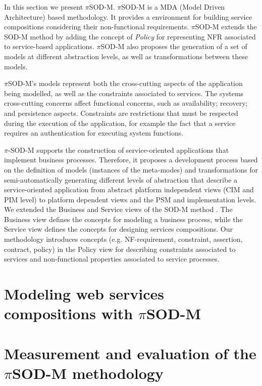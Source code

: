 \documentclass[runningheads,a4paper]{llncs}
\begin{document}
In this section we present $\pi$SOD-M. $\pi$SOD-M is a MDA (Model Driven
Architecture) based methodology. It provides a environment for building service compositions considering
their non-functional requirements. $\pi$SOD-M extends the SOD-M \cite{valeriaThesis} method by adding
the concept of \textit{Policy} \cite{Espinosa-OviedoVZC09,Espinosa-Oviedo2011a}
for representing NFR associated to service-based applications. $\pi$SOD-M also
proposes the generation of a set of models at different abstraction levels, as
well as transformations between these models.
  
$\pi$SOD-M's models represent both the cross-cutting aspects of the application
being modelled, as well as the constraints associated to services. The systems
cross-cutting concerns affect functional concerns, such as availability;
recovery; and persistence aspects. Constraints are restrictions that must be
respected during the execution of the application, for example the fact that a
service requires an authentication for executing system functions. 

$\pi$-SOD-M supports the construction of service-oriented applications that implement business processes.
Therefore, it proposes a development process based on the definition of models
(instances of the meta-modes) and transformations for semi-automatically
generating different levels of abstraction that describe a service-oriented
application from abstract platform independent views (CIM and PIM level) to
platform dependent views and the PSM and implementation levels. We extended the
Business and Service views of the SOD-M method \cite{CastroMV11}. The Business
view defines  the concepts for modeling a business process, while the Service
view defines the concepts  for designing services compositions. Our methodology
introduces concepts (e.g. NF-requirement, constraint, assertion, contract,
policy) in the Policy view for describing constraints associated to services and
non-functional properties associated to service processes.

\section{Modeling web services com\-po\-si\-tions with
$\pi$SOD-M}



\section{Measurement and evaluation of the $\pi$SOD-M methodology}
\end{document}
